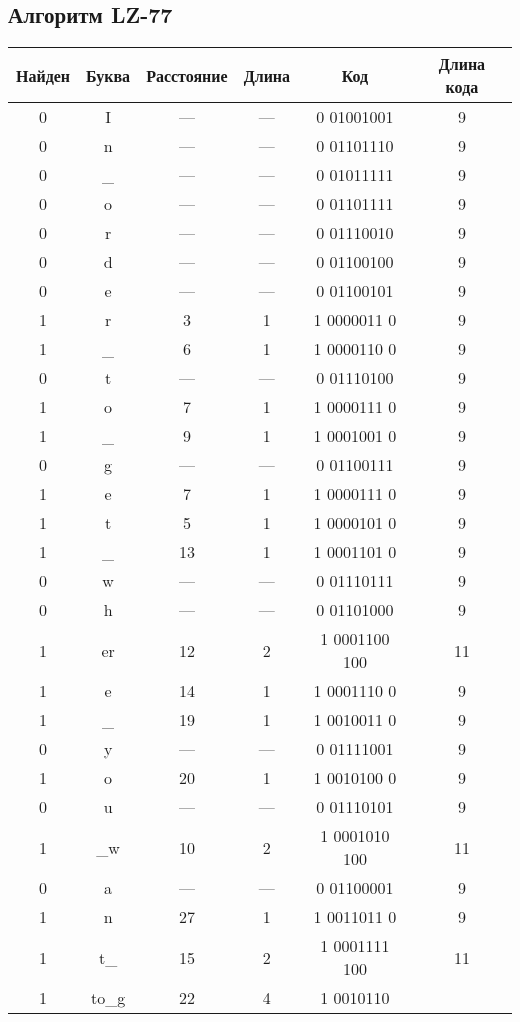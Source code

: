 \subsection{Алгоритм LZ-77}
\begin{center}
    \begin{longtable}{|c|c|c|c|c|c|}
    \hline
    Найден&Буква&Расстояние&Длина&Код&Длина кода\\    
 \hline  0&I&---&---&0 01001001&9\\  \hline  0&n&---&---&0 01101110&9\\  \hline  0&\_&---&---&0 01011111&9\\  \hline  0&o&---&---&0 01101111&9\\  \hline  0&r&---&---&0 01110010&9\\  \hline  0&d&---&---&0 01100100&9\\  \hline  0&e&---&---&0 01100101&9\\  \hline  1&r&3&1&1 0000011 0&9\\  \hline  1&\_&6&1&1 0000110 0&9\\  \hline  0&t&---&---&0 01110100&9\\  \hline  1&o&7&1&1 0000111 0&9\\  \hline  1&\_&9&1&1 0001001 0&9\\  \hline  0&g&---&---&0 01100111&9\\  \hline  1&e&7&1&1 0000111 0&9\\  \hline  1&t&5&1&1 0000101 0&9\\  \hline  1&\_&13&1&1 0001101 0&9\\  \hline  0&w&---&---&0 01110111&9\\  \hline  0&h&---&---&0 01101000&9\\  \hline  1&er&12&2&1 0001100 100&11\\  \hline  1&e&14&1&1 0001110 0&9\\  \hline  1&\_&19&1&1 0010011 0&9\\  \hline  0&y&---&---&0 01111001&9\\  \hline  1&o&20&1&1 0010100 0&9\\  \hline  0&u&---&---&0 01110101&9\\  \hline  1&\_w&10&2&1 0001010 100&11\\  \hline  0&a&---&---&0 01100001&9\\  \hline  1&n&27&1&1 0011011 0&9\\  \hline  1&t\_&15&2&1 0001111 100&11\\  \hline  1&to\_g&22&4&1 0010110 
\end{longtable}
\end{center}
